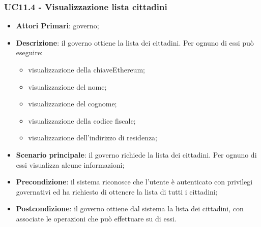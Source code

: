 \subsubsection{UC11.4 - Visualizzazione lista cittadini}
\begin{itemize}
	\item \textbf{Attori Primari}: governo;
	\item \textbf{Descrizione}: il governo ottiene la lista dei cittadini. Per ognuno di essi può eseguire:
	\begin{itemize}
		\item visualizzazione della chiave\glosp Ethereum;
		\item visualizzazione del nome;
		\item visualizzazione del cognome;
		\item visualizzazione della codice fiscale;
		\item visualizzazione dell'indirizzo di residenza;
	\end{itemize}
	\item \textbf{Scenario principale}: il governo richiede la lista dei cittadini. Per ognuno di essi visualizza alcune informazioni;
	\item \textbf{Precondizione}: il sistema riconosce che l'utente è autenticato con privilegi governativi ed ha richiesto di ottenere la lista di tutti i cittadini;
	\item \textbf{Postcondizione}: il governo ottiene dal sistema la lista dei cittadini, con associate le operazioni che può effettuare su di essi.
\end{itemize}
